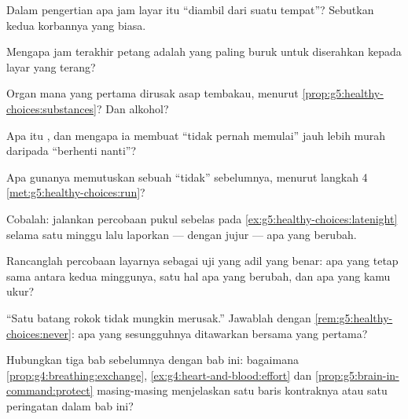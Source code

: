 \begin{exercise}[$\star$]\label{exo:g5:healthy-choices:3}
Dalam pengertian apa jam layar itu ``diambil dari suatu tempat''?
Sebutkan kedua korbannya yang biasa.
\end{exercise}

\begin{exercise}[$\star$]\label{exo:g5:healthy-choices:4}
Mengapa jam terakhir petang adalah yang paling buruk untuk diserahkan
kepada layar yang terang?
\end{exercise}

\begin{exercise}[$\star$]\label{exo:g5:healthy-choices:5}
Organ mana yang pertama dirusak asap tembakau, menurut
\cref{prop:g5:healthy-choices:substances}? Dan alkohol?
\end{exercise}

\begin{exercise}[$\star$]\label{exo:g5:healthy-choices:6}
Apa itu , dan mengapa ia membuat ``tidak pernah memulai''
jauh lebih murah daripada ``berhenti nanti''?
\end{exercise}

\begin{exercise}[$\star$]\label{exo:g5:healthy-choices:7}
Apa gunanya memutuskan sebuah ``tidak'' sebelumnya, menurut langkah 4
\cref{met:g5:healthy-choices:run}?
\end{exercise}

\begin{exercise}[$\star$]\label{exo:g5:healthy-choices:8}
Cobalah: jalankan percobaan pukul sebelas pada
\cref{ex:g5:healthy-choices:latenight} selama satu minggu lalu
laporkan --- dengan jujur --- apa yang berubah.
\end{exercise}

\begin{exercise}[$\star\star$]\label{exo:g5:healthy-choices:9}
Rancanglah percobaan layarnya sebagai uji yang adil yang benar: apa
yang tetap sama antara kedua minggunya, satu hal apa yang berubah, dan
apa yang kamu ukur?
\end{exercise}

\begin{exercise}[$\star\star$]\label{exo:g5:healthy-choices:10}
``Satu batang rokok tidak mungkin merusak.'' Jawablah dengan
\cref{rem:g5:healthy-choices:never}: apa yang sesungguhnya ditawarkan
bersama  yang pertama?
\end{exercise}

\begin{exercise}[$\star\star\star$]\label{exo:g5:healthy-choices:11}
Hubungkan tiga bab sebelumnya dengan bab ini: bagaimana
\cref{prop:g4:breathing:exchange},
\cref{ex:g4:heart-and-blood:effort} dan
\cref{prop:g5:brain-in-command:protect} masing-masing menjelaskan satu
baris kontraknya atau satu peringatan dalam bab ini?
\end{exercise}
